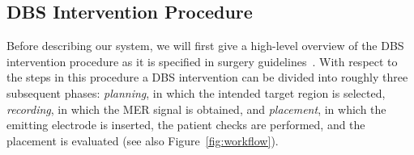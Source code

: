 \documentclass{vgtc}                          %
\begin{document}
\subsection{DBS Intervention Procedure}\label{sec:overview:procedure}
Before describing our system, we will first give a high-level overview of the DBS intervention procedure as it is specified in surgery guidelines~\cite{Hemm2010}. With respect to the steps in this procedure a DBS intervention can be divided into roughly three subsequent phases: \emph{planning}, in which the intended target region is selected, \emph{recording}, in which the MER signal is obtained, and \emph{placement}, in which the emitting electrode is inserted, the patient checks are performed, and the placement is evaluated (see also Figure~\ref{fig:workflow}). %
%
%
%
\end{document}
